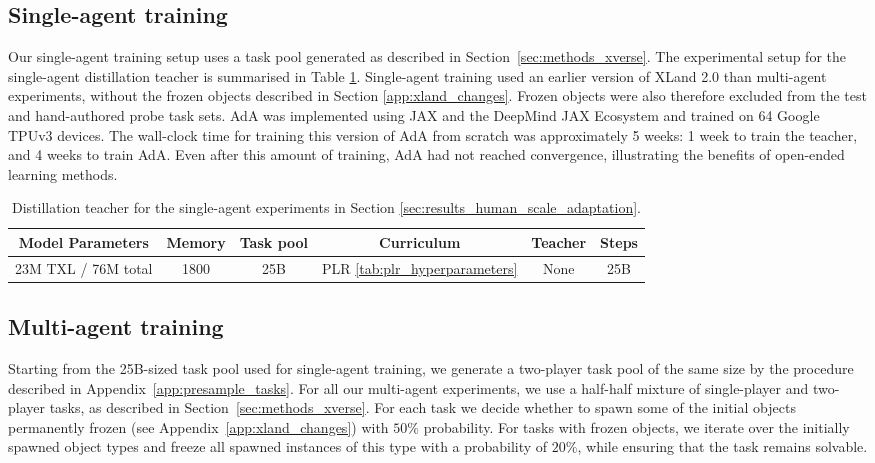 \subsection{Single-agent training}
\label{app:single_agent_training}

Our single-agent training setup uses a task pool generated as described in Section~\ref{sec:methods_xverse}. The experimental setup for the single-agent distillation teacher is summarised in Table \ref{tab:single-agent-teacher}. Single-agent training used an earlier version of XLand 2.0 than multi-agent experiments, without the frozen objects described in Section \ref{app:xland_changes}. Frozen objects were also therefore excluded from the test and hand-authored probe task sets. AdA was implemented using JAX \citep{jax2018github} and the DeepMind JAX Ecosystem \citep{deepmind2020jax} and trained on 64 Google TPUv3 devices. The wall-clock time for training this version of AdA from scratch was approximately 5 weeks: 1 week to train the teacher, and 4 weeks to train AdA. Even after this amount of training, AdA had not reached convergence, illustrating the benefits of open-ended learning methods.

\begin{table}[h!]
  \begin{center}
    \caption{Distillation teacher for the single-agent experiments in Section \ref{sec:results_human_scale_adaptation}.}
    \begin{tabular}{c|c|c|c|c|c}
    \label{tab:single-agent-teacher}
      Model Parameters & Memory & Task pool & Curriculum & Teacher & Steps\\
      \hline
      23M TXL / 76M total & 1800 & 25B & PLR \ref{tab:plr_hyperparameters} & None & 25B \\
    \end{tabular}
  \end{center}
\end{table}

\subsection{Multi-agent training}
\label{app:multi_agent_training}

Starting from the 25B-sized task pool used for single-agent training, we generate a two-player task pool of the same size by the procedure described in Appendix~\ref{app:presample_tasks}. For all our multi-agent experiments, we use a half-half mixture of single-player and two-player tasks, as described in Section~\ref{sec:methods_xverse}. For each task we decide whether to spawn some of the initial objects permanently frozen (see Appendix~\ref{app:xland_changes}) with $50\%$ probability. For tasks with frozen objects, we iterate over the initially spawned object types and freeze all spawned instances of this type with a probability of $20\%$, while ensuring that the task remains solvable.

